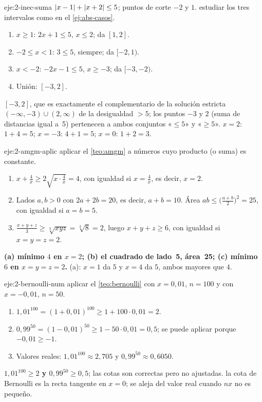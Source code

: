 \begin{solucion}{eje:2-inec-suma}
\datos $\lvert x-1\rvert+\lvert x+2\rvert\le5$; puntos de corte $-2$ y $1$.
\planteamiento estudiar los tres intervalos como en el \cref{ej:abs-casos}.
\pasos
\begin{enumerate}[label=\arabic*.]
  \item $x\ge1$: $2x+1\le5$, $x\le2$; da $[1,2]$.
  \item $-2\le x<1$: $3\le5$, siempre; da $[-2,1)$.
  \item $x<-2$: $-2x-1\le5$, $x\ge-3$; da $[-3,-2)$.
  \item Unión: $[-3,2]$.
\end{enumerate}
\resultado \textbf{$[-3,2]$}, que es exactamente el complementario de la solución estricta $(-\infty,-3)\cup(2,\infty)$ de la desigualdad $>5$; los puntos $-3$ y $2$ (suma de distancias igual a~5) pertenecen a ambos conjuntos «$\le5$» y «$\ge5$».
\comprobacion $x=2$: $1+4=5$; $x=-3$: $4+1=5$; $x=0$: $1+2=3$.
\end{solucion}

\begin{solucion}{eje:2-amgm-aplic}
\planteamiento aplicar el \cref{teo:amgm} a números cuyo producto (o suma) es constante.
\pasos
\begin{enumerate}[label=(\alph*)]
  \item $x+\frac4x\ge2\sqrt{x\cdot\frac4x}=4$, con igualdad si $x=\frac4x$, es decir, $x=2$.
  \item Lados $a,b>0$ con $2a+2b=20$, es decir, $a+b=10$. Área $ab\le\bigl(\frac{a+b}2\bigr)^2=25$, con igualdad si $a=b=5$.
  \item $\frac{x+y+z}3\ge\sqrt[3]{xyz}=\sqrt[3]8=2$, luego $x+y+z\ge6$, con igualdad si $x=y=z=2$.
\end{enumerate}
\resultado \textbf{(a) mínimo $4$ en $x=2$; (b) el cuadrado de lado~5, área~25; (c) mínimo $6$ en $x=y=z=2$.}
\comprobacion (a): $x=1$ da $5$ y $x=4$ da $5$, ambos mayores que $4$.
\end{solucion}

\begin{solucion}{eje:2-bernoulli-num}
\planteamiento aplicar el \cref{teo:bernoulli} con $x=0{,}01$, $n=100$ y con $x=-0{,}01$, $n=50$.
\pasos
\begin{enumerate}[label=\arabic*.]
  \item $1{,}01^{100}=(1+0{,}01)^{100}\ge1+100\cdot0{,}01=2$.
  \item $0{,}99^{50}=(1-0{,}01)^{50}\ge1-50\cdot0{,}01=0{,}5$; se puede aplicar porque $-0{,}01\ge-1$.
  \item Valores reales: $1{,}01^{100}\approx2{,}705$ y $0{,}99^{50}\approx0{,}6050$.
\end{enumerate}
\resultado \textbf{$1{,}01^{100}\ge2$ y $0{,}99^{50}\ge0{,}5$}; las cotas son correctas pero no ajustadas.
\comprobacion la cota de Bernoulli es la recta tangente en $x=0$; se aleja del valor real cuando $nx$ no es pequeño.
\end{solucion}

